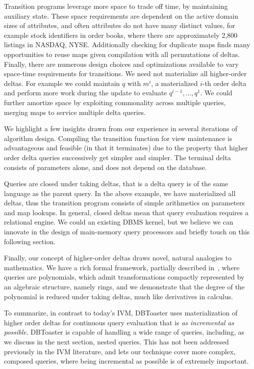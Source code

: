 Transition programs leverage more space to trade off time, by maintaining
auxiliary state. These space requirements are dependent on the active domain
sizes of attributes, and often attributes do not have many distinct values, for
example stock identifiers in order books, where there are approximately 2,800
listings in NASDAQ, NYSE. Additionally checking for duplicate maps finds many
opportunities to reuse maps given compilation with all permutations of deltas.
Finally, there are numerous design choices and optimizations available to vary
space-time requirements for transitions. We need not materialize all
higher-order deltas. For example we could maintain $q$ with $m^i$, a
materialized $i$-th order delta and perform more work during the update to
evaluate $q^{i-1}, \ldots, q^1$. We could further amortize space by exploiting
commonality across multiple queries, merging maps to service multiple delta
queries.



 We highlight a few insights drawn from our experience in
several iterations of algorithm design. Compiling the transition function for
view maintenance is advantageous and feasible (in that it terminates) due to the
property that higher order delta queries successively get simpler and simpler.
The terminal delta consists of parameters alone, and does not depend on the
database.

Queries are closed under taking deltas, that is a delta query is of the same
language as the parent query. In the above example, we have materialized all
deltas, thus the transition program consists of simple arithmetics on parameters
and map lookups. In general, closed deltas mean that query evaluation requires a
relational engine. We could an existing DBMS kernel, but we believe we can
innovate in the design of main-memory query processors and briefly touch on this
following section.

Finally, our concept of higher-order deltas draws novel, natural analogies to
mathematics. We have a rich formal framework, partially described
in~\cite{koch-pods:10}, where queries are polynomials, which admit
transformations compactly represented by an algebraic structure, namely rings,
and we demonstrate that the degree of the polynomial is reduced under taking
deltas, much like derivatives in calculus.

To summarize, in contrast to today's IVM, DBToaster uses materialization of
higher order deltas for continuous query evaluation that is \textit{as
incremental as possible}. DBToaster is capable of handling a wide range of
queries, including, as we discuss in the next section, nested queries. This has
not been addressed previously in the IVM literature, and lets our technique
cover more complex, composed queries, where being incremental as possible is of
extremely important.

